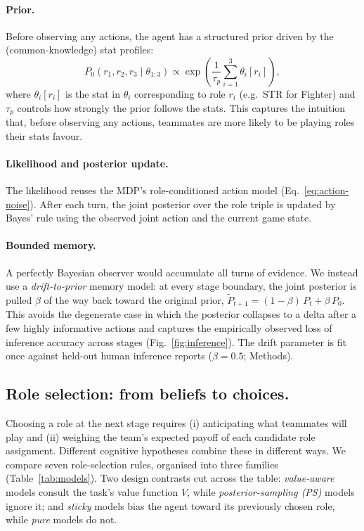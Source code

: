 \documentclass[9pt,twocolumn,twoside]{pnas-new}
\begin{document}
\paragraph*{Prior.} Before observing any actions, the agent has a
structured prior driven by the (common-knowledge) stat profiles:
\begin{equation}\label{eq:prior}
P_0(r_1,r_2,r_3 \mid \theta_{1:3}) \propto \exp\!\left(\frac{1}{\tau_p}
\sum_{i=1}^3 \theta_i[r_i]\right),
\end{equation}
where $\theta_i[r_i]$ is the stat in $\theta_i$ corresponding to role
$r_i$ (e.g.\ STR for Fighter) and $\tau_p$ controls how strongly the
prior follows the stats. This captures the intuition that, before
observing any actions, teammates are more likely to be playing roles
their stats favour.

\paragraph*{Likelihood and posterior update.} The likelihood reuses the
MDP's role-conditioned action model
(Eq.~\ref{eq:action-noise}). After each turn, the joint posterior over
the role triple is updated by Bayes' rule using the observed joint
action and the current game state.

\paragraph*{Bounded memory.} A perfectly Bayesian observer would
accumulate all turns of evidence. We instead use a \emph{drift-to-prior}
memory model: at every stage boundary, the joint posterior is pulled $\beta$
of the way back toward the original prior,
$\tilde{P}_{t+1} = (1-\beta)\,P_t + \beta\,P_0$. This avoids the
degenerate case in which the posterior collapses to a delta after a few
highly informative actions and captures the empirically observed loss
of inference accuracy across stages (Fig.~\ref{fig:inference}). The
drift parameter is fit once against held-out human inference reports
($\beta = 0.5$; Methods).

\subsection*{Role selection: from beliefs to choices.}\label{sec:models:selection}

Choosing a role at the next stage requires (i) anticipating what
teammates will play and (ii) weighing the team's expected payoff of
each candidate role assignment. Different cognitive hypotheses combine
these in different ways. We compare seven role-selection rules,
organised into three families (Table~\ref{tab:models}). Two design
contrasts cut across the table: \emph{value-aware} models consult the
task's value function $V$, while \emph{posterior-sampling (PS)} models
ignore it; and \emph{sticky} models bias the agent toward its
previously chosen role, while \emph{pure} models do not.
\end{document}
